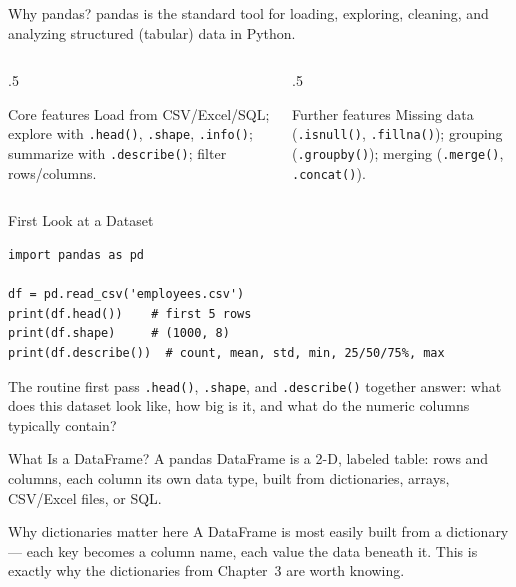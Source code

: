 \documentclass[9pt,aspectratio=169,xcolor=table]{beamer}
\begin{document}
\begin{frame}{Why pandas?}
    \leavevmode
    \alert{pandas} is the standard tool for loading, exploring, cleaning,
    and analyzing structured (tabular) data in Python.

    \vspace{2mm}
    \begin{columns}[t]
        \begin{column}{.5\textwidth}
            \begin{block}{Core features}
                \scriptsize Load from CSV/Excel/SQL; explore with
                \texttt{.head()}, \texttt{.shape}, \texttt{.info()};
                summarize with \texttt{.describe()}; filter rows/columns.
            \end{block}
        \end{column}
        \begin{column}{.5\textwidth}
            \begin{block}{Further features}
                \scriptsize Missing data (\texttt{.isnull()},
                \texttt{.fillna()}); grouping (\texttt{.groupby()});
                merging (\texttt{.merge()}, \texttt{.concat()}).
            \end{block}
        \end{column}
    \end{columns}
\end{frame}

\begin{frame}[fragile]{First Look at a Dataset}
    \leavevmode
\begin{lstlisting}
import pandas as pd

df = pd.read_csv('employees.csv')
print(df.head())    # first 5 rows
print(df.shape)     # (1000, 8)
print(df.describe())  # count, mean, std, min, 25/50/75%, max
\end{lstlisting}

    \begin{block}{The routine first pass}
        \small \texttt{.head()}, \texttt{.shape}, and \texttt{.describe()}
        together answer: what does this dataset look like, how big is
        it, and what do the numeric columns typically contain?
    \end{block}
\end{frame}

\begin{frame}{What Is a DataFrame?}
    \leavevmode
    A pandas \alert{DataFrame} is a 2-D, labeled table: rows and columns,
    each column its own data type, built from dictionaries, arrays,
    CSV/Excel files, or SQL.

    \vspace{2mm}
    \begin{block}{Why dictionaries matter here}
        A DataFrame is most easily built from a dictionary --- each key
        becomes a column name, each value the data beneath it. This is
        exactly why the dictionaries from Chapter~3 are worth knowing.
    \end{block}
\end{frame}
\end{document}
